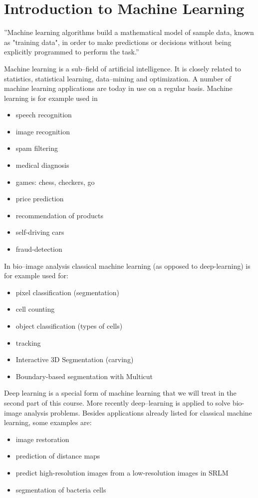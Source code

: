 \chapter{Introduction to Machine Learning}

\begin{displayquote}
''Machine learning algorithms build a mathematical model of sample data, known as "training data", in order to make predictions or decisions without being explicitly programmed to perform the task.''\cite{wiki:machine_learning_2019}
\end{displayquote}

Machine learning is a sub--field of artificial intelligence. It is closely related to statistics, statistical learning, data--mining and optimization. A number of machine learning applications are today in use on a regular basis. Machine learning is for example used in 

\begin{itemize}
\item speech recognition
\item image recognition 
\item spam filtering
\item medical diagnosis
\item games: chess, checkers, go
\item price prediction
\item recommendation of products
\item self-driving cars 
\item fraud-detection
\end{itemize}

In bio--image analysis classical machine learning (as opposed to deep-learning) is for example used for:

\begin{itemize}
\item pixel classification (segmentation)
\item cell counting
\item object classification (types of cells)
\item tracking
\item Interactive 3D Segmentation (carving)
\item Boundary-based segmentation with Multicut
\end{itemize}

Deep learning is a special form of machine learning that we will treat in the second part of this course. More recently deep--learning is applied to solve bio-image analysis problems. Besides applications already listed for classical machine learning, some examples are:

\begin{itemize}
\item image restoration
\item prediction of distance maps
\item predict high-resolution images from a low-resolution images in SRLM
\item segmentation of bacteria cells 
\end{itemize}

